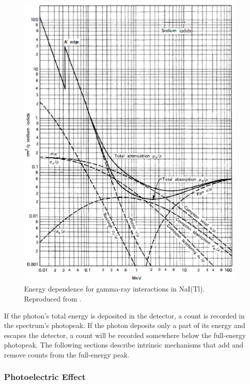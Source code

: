 \begin{figure}[H]
	\centering
	\includegraphics[width=0.75\linewidth]{images/energy_dependence_interactions}
	\caption{Energy dependence for gamma-ray interactions in NaI(Tl). Reproduced from \cite{knoll}.}
	\label{fig:energy_dependence_interactions}
\end{figure}

If the photon's total energy is deposited in the detector, a count is recorded in the spectrum's photopeak. If the photon deposits only a part of its energy and escapes the detector, a count will be recorded somewhere below the full-energy photopeak.  The following sections describe intrinsic mechanisms that add and remove counts from the full-energy peak.



\subsubsection{Photoelectric Effect}

